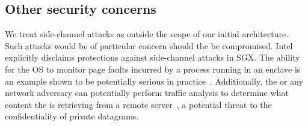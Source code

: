 %
%
%
%
%
%

\subsection{Other security concerns}
We treat side-channel attacks as outside the scope of our initial \tc architecture. Such attacks would be of particular concern should the \medname be compromised. Intel explicitly disclaims protections against side-channel attacks in SGX. The ability for the OS to monitor page faults incurred by a process running in an enclave is an example shown to be potentially serious in practice~\cite{}. Additionally, the \medname or any network adversary can potentially perform traffic analysis to determine what content the \encname is retrieving from a remote server~\cite{}, a potential threat to the confidentiality of private datagrams.


